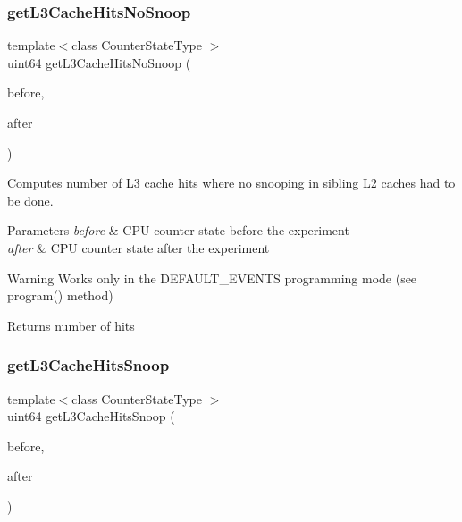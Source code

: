 \subsubsection{get\+L3\+Cache\+Hits\+No\+Snoop}
{\footnotesize\ttfamily template$<$class Counter\+State\+Type $>$ \\
uint64 get\+L3\+Cache\+Hits\+No\+Snoop (\begin{DoxyParamCaption}\item[{const Counter\+State\+Type \&}]{before,  }\item[{const Counter\+State\+Type \&}]{after }\end{DoxyParamCaption})\hspace{0.3cm}{\ttfamily [friend]}}



Computes number of L3 cache hits where no snooping in sibling L2 caches had to be done. 


\begin{DoxyParams}{Parameters}
{\em before} & C\+PU counter state before the experiment \\
\hline
{\em after} & C\+PU counter state after the experiment \\
\hline
\end{DoxyParams}
\begin{DoxyWarning}{Warning}
Works only in the D\+E\+F\+A\+U\+L\+T\+\_\+\+E\+V\+E\+N\+TS programming mode (see program() method) 
\end{DoxyWarning}
\begin{DoxyReturn}{Returns}
number of hits 
\end{DoxyReturn}
\mbox{\label{classBasicCounterState_a4b1050ca9ccdd66661df556bab70fd0f}} 
\subsubsection{get\+L3\+Cache\+Hits\+Snoop}
{\footnotesize\ttfamily template$<$class Counter\+State\+Type $>$ \\
uint64 get\+L3\+Cache\+Hits\+Snoop (\begin{DoxyParamCaption}\item[{const Counter\+State\+Type \&}]{before,  }\item[{const Counter\+State\+Type \&}]{after }\end{DoxyParamCaption})\hspace{0.3cm}{\ttfamily [friend]}}



